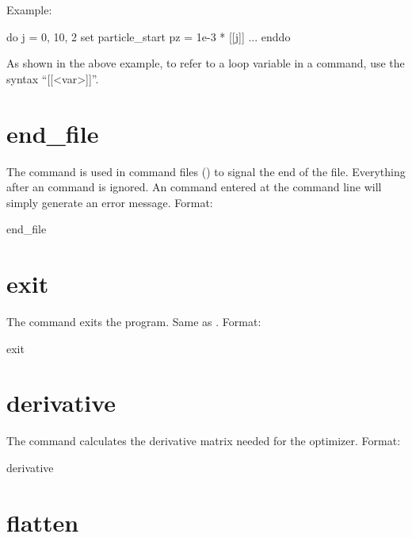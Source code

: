 Example:
\begin{example}
  do j = 0, 10, 2
    set particle_start pz = 1e-3 * [[j]]
    ...
  enddo
\end{example}
As shown in the above example, to refer to a loop variable in a command, use the syntax ``[[<var>]]''.

\section{end_file} \label{s:end.file}

The  command is used in command files () to signal the end of the
file. Everything after an  command is ignored. An  command entered at the
command line will simply generate an error message.  Format:
\begin{example}
  end_file
\end{example}

\section{exit}
\label{s:exit}

The  command exits the program. Same as .  Format:
\begin{example}
  exit
\end{example}

\section{derivative}
\label{s:deriv}

The  command calculates the  derivative matrix needed for the
 optimizer.  Format:
\begin{example}
  derivative
\end{example}

\section{flatten}
\label{s:flatten}


